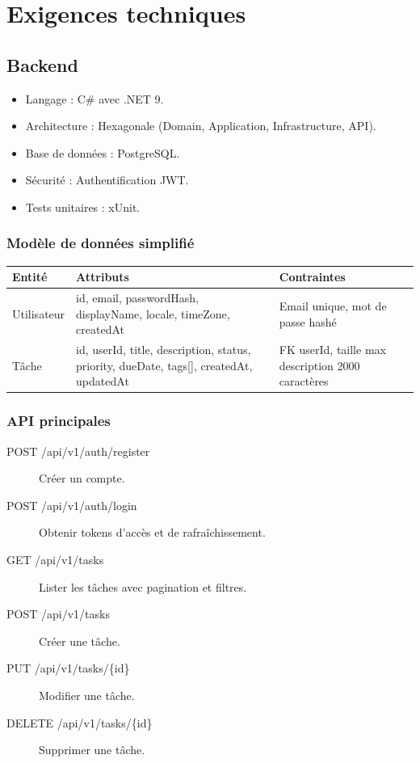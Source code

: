 \section{Exigences techniques}
\subsection{Backend}
\begin{itemize}
	\item Langage : C\# avec .NET 9.
	\item Architecture : Hexagonale (Domain, Application, Infrastructure, API).
	\item Base de données : PostgreSQL.
	\item Sécurité : Authentification JWT.
	\item Tests unitaires : xUnit.
\end{itemize}

\subsubsection{Modèle de données simplifié}
\begin{tabular}{|l|p{5cm}|p{6cm}|}
	\hline
	\textbf{Entité} & \textbf{Attributs} & \textbf{Contraintes} \\ \hline
	Utilisateur & id, email, passwordHash, displayName, locale, timeZone, createdAt & Email unique, mot de passe hashé \\ \hline
	Tâche & id, userId, title, description, status, priority, dueDate, tags[], createdAt, updatedAt & FK userId, taille max description 2000 caractères \\ \hline
\end{tabular}

\subsubsection{API principales}
\begin{description}
	\item[POST /api/v1/auth/register] Créer un compte.
	\item[POST /api/v1/auth/login] Obtenir tokens d'accès et de rafraîchissement.
	\item[GET /api/v1/tasks] Lister les tâches avec pagination et filtres.
	\item[POST /api/v1/tasks] Créer une tâche.
	\item[PUT /api/v1/tasks/\{id\}] Modifier une tâche.
	\item[DELETE /api/v1/tasks/\{id\}] Supprimer une tâche.
\end{description}

